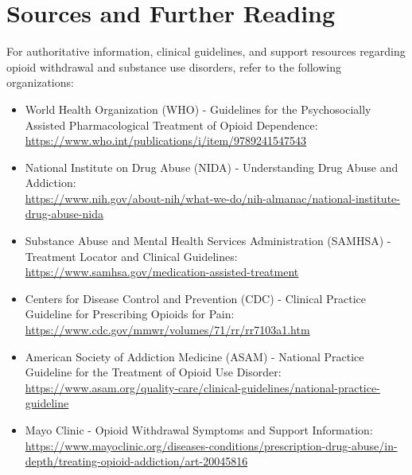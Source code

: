 \section*{Sources and Further Reading}
For authoritative information, clinical guidelines, and support resources regarding opioid withdrawal and substance use disorders, refer to the following organizations:
\begin{itemize}
    \item World Health Organization (WHO) - Guidelines for the Psychosocially Assisted Pharmacological Treatment of Opioid Dependence:\\ \url{https://www.who.int/publications/i/item/9789241547543}
    \item National Institute on Drug Abuse (NIDA) - Understanding Drug Abuse and Addiction:\\ \url{https://www.nih.gov/about-nih/what-we-do/nih-almanac/national-institute-drug-abuse-nida}
    \item Substance Abuse and Mental Health Services Administration (SAMHSA) - Treatment Locator and Clinical Guidelines:\\ \url{https://www.samhsa.gov/medication-assisted-treatment}
    \item Centers for Disease Control and Prevention (CDC) - Clinical Practice Guideline for Prescribing Opioids for Pain:\\ \url{https://www.cdc.gov/mmwr/volumes/71/rr/rr7103a1.htm}
    \item American Society of Addiction Medicine (ASAM) - National Practice Guideline for the Treatment of Opioid Use Disorder:\\ \url{https://www.asam.org/quality-care/clinical-guidelines/national-practice-guideline}
    \item Mayo Clinic - Opioid Withdrawal Symptoms and Support Information:\\ \url{https://www.mayoclinic.org/diseases-conditions/prescription-drug-abuse/in-depth/treating-opioid-addiction/art-20045816}
\end{itemize}
